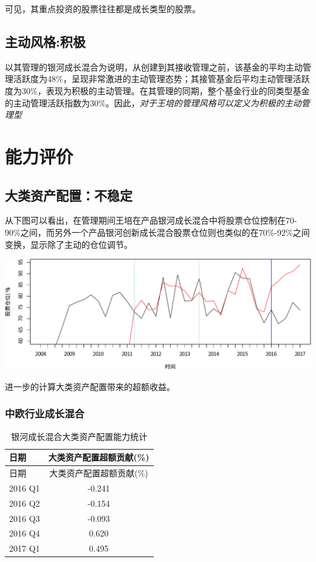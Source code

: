\documentclass[hyperref,]{ctexart}
\begin{document}
可见，其重点投资的股票往往都是成长类型的股票。

\subsection{主动风格:积极}

以其管理的银河成长混合为说明，从创建到其接收管理之前，该基金的平均主动管理活跃度为48\%，呈现非常激进的主动管理态势；其接管基金后平均主动管理活跃度为30\%，表现为积极的主动管理。在其管理的同期，整个基金行业的同类型基金的主动管理活跃指数为30\%。因此，\emph{对于王培的管理风格可以定义为积极的主动管理型}

\section{能力评价}

\subsection{大类资产配置：不稳定}

从下图可以看出，在管理期间王培在产品银河成长混合中将股票仓位控制在70-90\%之间，而另外一个产品银河创新成长混合股票仓位则也类似的在70\%-92\%之间变换，显示除了主动的仓位调节。

\includegraphics{wangpei-details_files/figure-latex/unnamed-chunk-17-1.pdf}

进一步的计算大类资产配置带来的超额收益。

\subsubsection{中欧行业成长混合}\label{-1}

\begin{longtable}[]{@{}lc@{}}
\caption{银河成长混合大类资产配置能力统计}\tabularnewline
\toprule
日期 & 大类资产配置超额贡献(\%)\tabularnewline
\midrule
\endfirsthead
\toprule
日期 & 大类资产配置超额贡献(\%)\tabularnewline
\midrule
\endhead
2016 Q1 & -0.241\tabularnewline
2016 Q2 & -0.154\tabularnewline
2016 Q3 & -0.093\tabularnewline
2016 Q4 & 0.620\tabularnewline
2017 Q1 & 0.495\tabularnewline
\bottomrule
\end{longtable}
\end{document}
